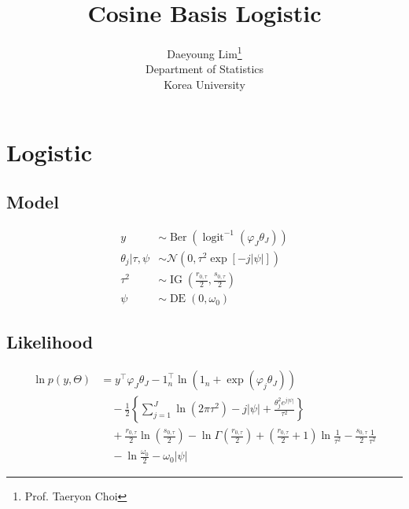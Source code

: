 \documentclass[11pt]{article}
\newcommand{\opn}{\operatorname}
\begin{document}
\nocite{*}

\title{Cosine Basis Logistic}

\author{Daeyoung Lim\thanks{Prof. Taeryon Choi} \\
Department of Statistics \\
Korea University}

\maketitle
\section{Logistic}
\subsection{Model}
  \begin{align*}
    y &\sim \opn{Ber}\left(\opn{logit}^{-1}\left(\varphi_{J}\theta_{J}\right)\right)\\
    \theta_{j}| \tau, \psi &\sim \mathcal{N}\left(0, \tau^{2}\exp\left[-j\left|\psi\right|\right]\right)\\
    \tau^{2} &\sim \opn{IG}\left(\frac{r_{0,\tau}}{2}, \frac{s_{0,\tau}}{2}\right)\\
    \psi &\sim \opn{DE}\left(0,\omega_{0}\right)
  \end{align*}
\subsection{Likelihood}
  \begin{align*}
    \ln p\left(y, \Theta\right) &= y^{\top}\varphi_{J}\theta_{J} - 1_{n}^{\top}\ln \left(1_{n} + \exp\left(\varphi_{j}\theta_{J}\right)\right)\\
    &\quad -\frac{1}{2}\left\{\sum_{j=1}^{J}\ln\left(2\pi\tau^{2}\right) - j\left|\psi\right| + \frac{\theta_{j}^{2}e^{j\left|\psi\right|}}{\tau^{2}}\right\}\\
    &\quad +\frac{r_{0,\tau}}{2}\ln\left(\frac{s_{0,\tau}}{2}\right) - \ln\Gamma\left(\frac{r_{0,\tau}}{2}\right) + \left(\frac{r_{0,\tau}}{2}+1\right)\ln\frac{1}{\tau^{2}} -\frac{s_{0,\tau}}{2}\frac{1}{\tau^{2}}\\
    &\quad -\ln\frac{\omega_{0}}{2} -\omega_{0}\left|\psi\right|
  \end{align*}
\end{document}
